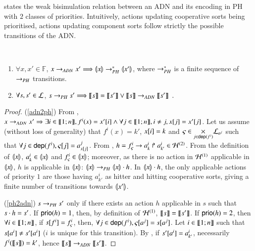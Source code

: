  states the weak bisimulation relation between an ADN and its encoding in
PH with $2$ classes of priorities.
Intuitively, actions updating cooperative sorts being prioritised, actions updating component
sorts follow strictly the possible transitions of the ADN.

\begin{theorem}[$\DNdef \approx \toPH\DNdef$]~
\label{thm:bisimDN}
  \begin{enumerate}
    \item \label{adn2ph} $\forall x,x'\in\mathbb F$,
      $x\rightarrow_{ADN} x' \Longrightarrow \llparenthesis x\rrparenthesis \rightarrow_{PH}^* \llparenthesis x'\rrparenthesis$,
      where $\rightarrow_{PH}^*$ is a finite sequence of $\rightarrow_{PH}$ transitions.

    \item \label{ph2adn} $\forall s,s'\in \mathcal{L}$,
      $s\rightarrow_{PH} s' \Longrightarrow \llbracket s\rrbracket = \llbracket s'\rrbracket \vee \llbracket s\rrbracket \rightarrow_{ADN}
      \llbracket s'\rrbracket\enspace.$
  \end{enumerate}
\end{theorem}
\begin{proof}
(\ref{adn2ph}) From , $x\rightarrow_{ADN} x'\Rightarrow \exists i\in\llbracket 1; n \rrbracket,
f^i(x)=x'[{i}] \wedge \forall j\in\llbracket 1; n \rrbracket,i\neq j, x[{j}]=x'[{j}]$.
Let us assume (without loss of generality) that $f^i(x)=k'$, $x[{i}]=k$ and
$\varsigma\in\underset{j\in\mathsf{dep}(f^i)}{\times} \mathcal{L}_{a^j}$ such that
$\forall j\in\mathsf{dep}(f^i), \varsigma[{j}]=a^j_{x[{j}]}$.
From , $h=f^i_\varsigma\rightarrow a^i_k\Rsh a^i_{k'}\in\mathcal{H}^{(2)}$.
From the definition of $\llparenthesis x\rrparenthesis$,
$a^i_k\in \llparenthesis x\rrparenthesis$ and $f^i_\varsigma\in \llparenthesis x\rrparenthesis$;
moreover, as there is no action in $\mathcal{H}^{(1)}$ applicable in $\llparenthesis x\rrparenthesis$,
$h$ is applicable in $\llparenthesis x\rrparenthesis$:
$\llparenthesis x\rrparenthesis\rightarrow_{PH} \llparenthesis x\rrparenthesis\cdot h$.
In $\llparenthesis x\rrparenthesis\cdot h$, the only applicable actions of priority $1$ are those having
$a^i_{k'}$ as hitter and hitting cooperative sorts, giving a finite number of transitions towards
$\llparenthesis x'\rrparenthesis$.

(\ref{ph2adn}) $s\rightarrow_{PH} s'$ only if there exists an action $h$ applicable in $s$ such that
$s\cdot h=s'$.
If $\mathsf{prio}(h)=1$, then, by definition of $\mathcal{H}^{(1)}$, 
$\llbracket s\rrbracket=\llbracket s'\rrbracket$.
If $\mathsf{prio}(h)=2$, then $\forall i\in\llbracket 1; n \rrbracket$,
if $s[{f^i}] = f^i_\varsigma$, then, $\forall j\in\mathsf{dep}(f^i),
\varsigma[{a^j}]=s[{a^j}]$.
Let $i\in\llbracket 1; n \rrbracket$ such that $s[{a^i}]\neq s'[{a^i}]$ ($i$ is unique for this
transition).
By , if $s'[{a^i}]=a^i_{k'}$, necessarily $f^i(\llbracket s\rrbracket)=k'$, hence
$\llbracket s\rrbracket\rightarrow_{ADN} \llbracket s'\rrbracket$.
\end{proof}


